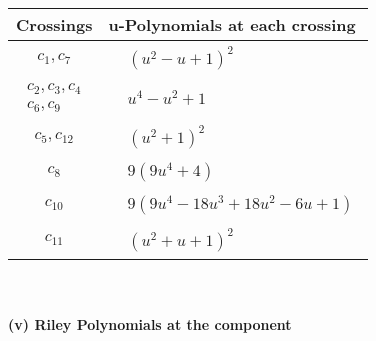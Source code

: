 \documentclass[1p]{elsarticle_modified}
\theoremstyle{definition}
\begin{document}
\begin{tabular}{m{50pt}|m{274pt}}
Crossings & \hspace{64pt}u-Polynomials at each crossing \\
\hline $$\begin{aligned}c_{1},c_{7}\end{aligned}$$&$\begin{aligned}
&(u^2- u+1)^2
\end{aligned}$\\
\hline $$\begin{aligned}c_{2},c_{3},c_{4}\\c_{6},c_{9}\end{aligned}$$&$\begin{aligned}
&u^4- u^2+1
\end{aligned}$\\
\hline $$\begin{aligned}c_{5},c_{12}\end{aligned}$$&$\begin{aligned}
&(u^2+1)^2
\end{aligned}$\\
\hline $$\begin{aligned}c_{8}\end{aligned}$$&$\begin{aligned}
&9(9 u^4+4)
\end{aligned}$\\
\hline $$\begin{aligned}c_{10}\end{aligned}$$&$\begin{aligned}
&9(9 u^4-18 u^3+18 u^2-6 u+1)
\end{aligned}$\\
\hline $$\begin{aligned}c_{11}\end{aligned}$$&$\begin{aligned}
&(u^2+u+1)^2
\end{aligned}$\\
\hline
\end{tabular}\\~\\
\newpage\renewcommand{\arraystretch}{1}
\flushleft \textbf{(v) Riley Polynomials at the component}\newline \\
\end{document}
